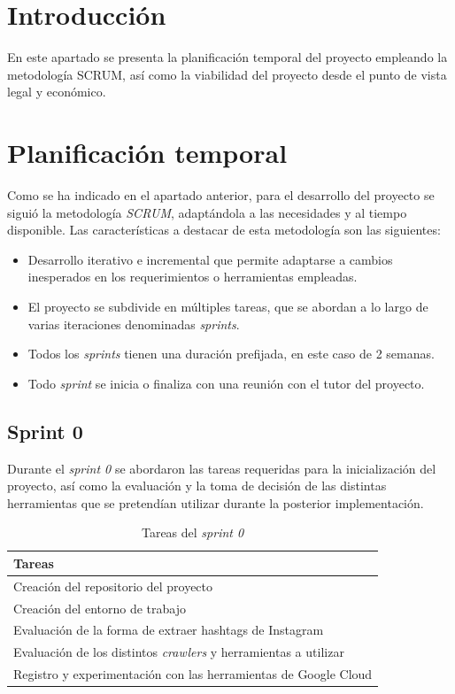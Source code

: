 
\section{Introducción}

En este apartado se presenta la planificación temporal del proyecto empleando la metodología SCRUM, así como la viabilidad del proyecto desde el punto de vista legal y económico.

\section{Planificación temporal}

Como se ha indicado en el apartado anterior, para el desarrollo del proyecto se siguió la metodología \textit{SCRUM}, adaptándola a las necesidades y al tiempo disponible. Las características a destacar de esta metodología son las siguientes:

\begin{itemize}
    \item Desarrollo iterativo e incremental que permite adaptarse a cambios inesperados en los requerimientos o herramientas empleadas.
    \item El proyecto se subdivide en múltiples tareas, que se abordan a lo largo de varias iteraciones denominadas \textit{sprints}.
    \item Todos los \textit{sprints} tienen una duración prefijada, en este caso de 2 semanas.
    \item Todo \textit{sprint} se inicia o finaliza con una reunión con el tutor del proyecto.
\end{itemize}

\subsection{Sprint 0}
Durante el \textit{sprint 0} se abordaron las tareas requeridas para la inicialización del proyecto, así como la evaluación y la toma de decisión de las distintas herramientas que se pretendían utilizar durante la posterior implementación.

\begin{table}[H]
    \centering
    \begin{tabular}{l}
    \hline
    \textbf{Tareas} \\ \hline
    Creación del repositorio del proyecto \\
    Creación del entorno de trabajo \\
    Evaluación de la forma de extraer hashtags de Instagram \\
    Evaluación de los distintos \textit{crawlers} y herramientas a utilizar \\
    Registro y experimentación con las herramientas de Google Cloud \\ \hline
    \end{tabular}
    \caption{Tareas del \textit{sprint 0}}
    \label{tab:tasks_sprint0}
\end{table}

